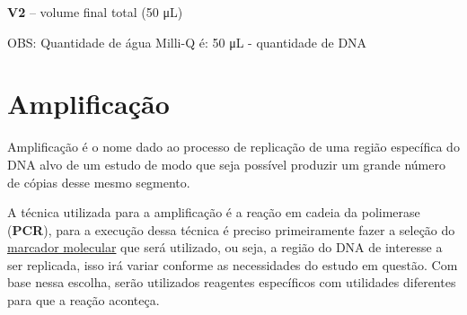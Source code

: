 \documentclass[
  letterpaper,
  DIV=11,
  numbers=noendperiod]{scrreprt}
\begin{document}
\textbf{V2} -- volume final total (50 μL)

OBS: Quantidade de água Milli-Q é: 50 μL - quantidade de DNA

\hypertarget{amplificauxe7uxe3o}{%
\chapter{Amplificação}\label{amplificauxe7uxe3o}}

Amplificação é o nome dado ao processo de replicação de uma região
específica do DNA alvo de um estudo de modo que seja possível produzir
um grande número de cópias desse mesmo segmento.

A técnica utilizada para a amplificação é a reação em cadeia da
polimerase (\textbf{PCR}), para a execução dessa técnica é preciso
primeiramente fazer a seleção do
\protect\hyperlink{marcadores-moleculares}{marcador molecular} que será
utilizado, ou seja, a região do DNA de interesse a ser replicada, isso
irá variar conforme as necessidades do estudo em questão. Com base nessa
escolha, serão utilizados reagentes específicos com utilidades
diferentes para que a reação aconteça.
\end{document}
